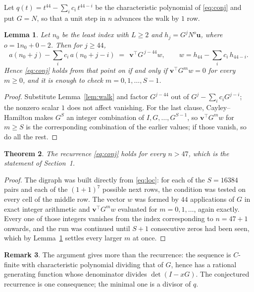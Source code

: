 \documentclass[11pt,a4paper]{article}
\theoremstyle{plain}
\newtheorem{theorem}{Theorem}
\newtheorem{lemma}[theorem]{Lemma}
\theoremstyle{definition}
\newtheorem{remark}[theorem]{Remark}
\begin{document}
Let $q(t)=t^{44}-\sum_i c_i\,t^{44-i}$ be the characteristic polynomial of
\eqref{eq:conj} and put $G=N$, so that a unit step in $n$ advances the walk by
$1$ row.

\begin{lemma}\label{lem:crit}
Let $n_0$ be the least index with $L\ge2$ and $h_j=G^{j}N^{o}\mathbf{u}$, where
$o=1n_0+0-2$. Then for $j\ge44$,
\[
a(n_0+j)-\sum_i c_i\,a(n_0+j-i)\;=\;\,\mathbf{v}^{\!\top}G^{\,j-44}w,
\qquad w=h_{44}-\sum_i c_i\,h_{44-i} .
\]
Hence \eqref{eq:conj} holds from that point on if and only if
$\mathbf{v}^{\!\top}G^{m}w=0$ for every $m\ge0$, and it is enough to check
$m=0,1,\dots,S-1$.
\end{lemma}

\begin{proof}
Substitute Lemma~\ref{lem:walk} and factor $G^{j-44}$ out of
$G^{j}-\sum_ic_iG^{j-i}$; the nonzero scalar $1$ does not affect
vanishing. For the last clause, Cayley--Hamilton makes $G^{S}$ an integer combination of
$I,G,\dots,G^{S-1}$, so $\mathbf{v}^{\!\top}G^{m}w$ for $m\ge S$ is the corresponding
combination of the earlier values; if those vanish, so do all the rest.
\end{proof}

\begin{theorem}
The recurrence \eqref{eq:conj} holds for every $n>47$, which is the statement of
Section~1.
\end{theorem}

\begin{proof}
The digraph was built directly from \eqref{eq:loc}: for each of the $S=16384$ pairs and each
of the $(1+1)^{7}$ possible next rows, the condition was tested on every cell of
the middle row. The vector $w$ was formed by $44$ applications of $G$ in exact integer
arithmetic and $\mathbf{v}^{\!\top}G^{m}w$ evaluated for $m=0,1,\dots$, again exactly.
Every one of those integers vanishes from the index corresponding to $n=47+1$ onwards,
and the run was continued until $S+1$ consecutive zeros had been seen, which by
Lemma~\ref{lem:crit} settles every larger $m$ at once.
\end{proof}

\begin{remark}
The argument gives more than the recurrence: the sequence is $C$-finite with characteristic
polynomial dividing that of $G$, hence has a rational generating function whose denominator
divides $\det(I-xG)$. The conjectured recurrence is one consequence; the minimal one is a
divisor of $q$.
\end{remark}
\end{document}
